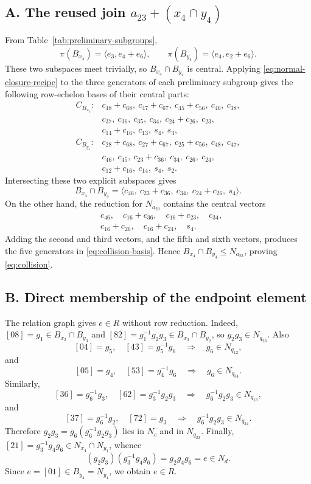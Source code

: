 \documentclass[journal]{IEEEtran}
\begin{document}
\subsection*{A. The reused join $a_{23}+(x_4\cap y_4)$}
From Table~\ref{tab:preliminary-subgroups},
\[
 \pi(B_{x_4})=\langle e_3,e_4+e_6\rangle,
 \qquad
 \pi(B_{y_4})=\langle e_4,e_2+e_6\rangle.
\]
These two subspaces meet trivially, so $B_{x_4}\cap B_{y_4}$ is central.
Applying \eqref{eq:normal-closure-recipe} to the three generators of each
preliminary subgroup gives the following row-echelon bases of their central
parts:
\[
\begin{array}{ll}
C_{B_{x_4}}:&
 c_{48}+c_{68},\ c_{47}+c_{67},\ c_{45}+c_{56},\ c_{46},\ c_{38},\\
&c_{37},\ c_{36},\ c_{35},\ c_{34},\ c_{24}+c_{26},\ c_{23},\\
&c_{14}+c_{16},\ c_{13},\ s_4,\ s_3,\\[1mm]
C_{B_{y_4}}:&
 c_{28}+c_{68},\ c_{27}+c_{67},\ c_{25}+c_{56},\ c_{48},\ c_{47},\\
&c_{46},\ c_{45},\ c_{23}+c_{36},\ c_{34},\ c_{26},\ c_{24},\\
&c_{12}+c_{16},\ c_{14},\ s_4,\ s_2.
\end{array}
\]
Intersecting these two explicit subspaces gives
\begin{equation}\label{eq:collision-basis}
 B_{x_4}\cap B_{y_4}
 =\langle c_{46},\ c_{23}+c_{36},\ c_{34},\ c_{24}+c_{26},\ s_4\rangle.
\end{equation}
On the other hand, the reduction for $N_{a_{23}}$ contains the central
vectors
\begin{align*}
 &c_{46},\quad c_{16}+c_{36},\quad c_{16}+c_{23},\quad c_{34},\\
 &c_{16}+c_{26},\quad c_{16}+c_{24},\quad s_4.
\end{align*}
Adding the second and third vectors, and the fifth and sixth vectors, produces
the five generators in \eqref{eq:collision-basis}.  Hence
$B_{x_4}\cap B_{y_4}\le N_{a_{23}}$, proving
\eqref{eq:collision}.

\subsection*{B. Direct membership of the endpoint element}
The relation graph gives $e\in R$ without row reduction.  Indeed,
$[08]=g_1\in B_{x_2}\cap B_{y_3}$ and
$[82]=g_1^{-1}g_2g_3\in B_{x_3}\cap B_{y_2}$, so
$g_2g_3\in N_{q_{23}}$.  Also
\[
 [04]=g_5,\quad [43]=g_5^{-1}g_6
 \quad\Longrightarrow\quad g_6\in N_{q_{12}},
\]
and
\[
 [05]=g_4,\quad [53]=g_4^{-1}g_6
 \quad\Longrightarrow\quad g_6\in N_{q_{34}}.
\]
Similarly,
\[
 [36]=g_6^{-1}g_3,\quad [62]=g_3^{-1}g_2g_3
 \quad\Longrightarrow\quad g_6^{-1}g_2g_3\in N_{q_{13}},
\]
and
\[
 [37]=g_6^{-1}g_2,\quad [72]=g_3
 \quad\Longrightarrow\quad g_6^{-1}g_2g_3\in N_{q_{24}}.
\]
Therefore $g_2g_3=g_6(g_6^{-1}g_2g_3)$ lies in $N_c$ and in
$N_{q_{23}}$.  Finally,
$[21]=g_3^{-1}g_4g_6\in N_{x_4}\cap N_{y_1}$, whence
\[
 (g_2g_3)(g_3^{-1}g_4g_6)=g_2g_4g_6=e\in N_d.
\]
Since $e=[01]\in B_{y_4}=N_{y_4}$, we obtain $e\in R$.
\end{document}
